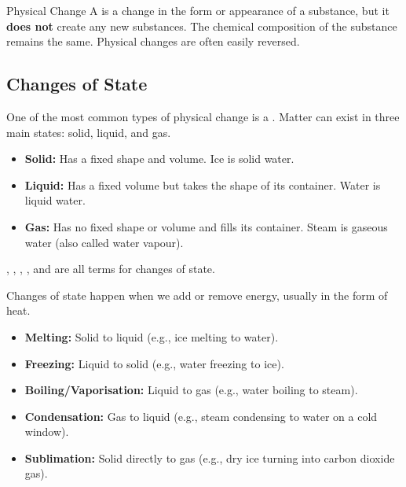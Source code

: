 \begin{keyconcept}{Physical Change}
A  is a change in the form or appearance of a substance, but it \textbf{does not} create any new substances. The chemical composition of the substance remains the same. Physical changes are often easily reversed.
\end{keyconcept}

\subsection{Changes of State}

One of the most common types of physical change is a . Matter can exist in three main states: solid, liquid, and gas.

\begin{itemize}
    \item \textbf{Solid:}  Has a fixed shape and volume. Ice is solid water.
    \item \textbf{Liquid:} Has a fixed volume but takes the shape of its container. Water is liquid water.
    \item \textbf{Gas:} Has no fixed shape or volume and fills its container. Steam is gaseous water (also called water vapour).
\end{itemize}

\begin{marginnote}
, , , , and  are all terms for changes of state.
\end{marginnote}

Changes of state happen when we add or remove energy, usually in the form of heat.

\begin{itemize}
    \item \textbf{Melting:} Solid to liquid (e.g., ice melting to water).
    \item \textbf{Freezing:} Liquid to solid (e.g., water freezing to ice).
    \item \textbf{Boiling/Vaporisation:} Liquid to gas (e.g., water boiling to steam).
    \item \textbf{Condensation:} Gas to liquid (e.g., steam condensing to water on a cold window).
    \item \textbf{Sublimation:} Solid directly to gas (e.g., dry ice turning into carbon dioxide gas). 
\end{itemize}

